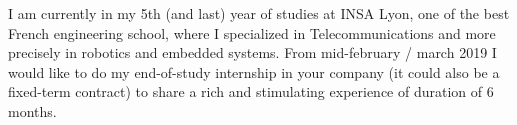 \documentclass[11pt, a4paper]{awesome-cv}
\begin{document}
\makecvheader[R]


\makelettertitle

\begin{cvletter}

I am currently in my 5th (and last) year of studies at INSA Lyon, one of the best French engineering school, where I specialized in Telecommunications and more precisely in robotics and embedded systems. From mid-february / march 2019 I would like to do my end-of-study internship in your company (it could also be a fixed-term contract) to share a rich and stimulating experience of duration of 6 months. 

\vspace{2mm} %




\end{cvletter}
\end{document}
